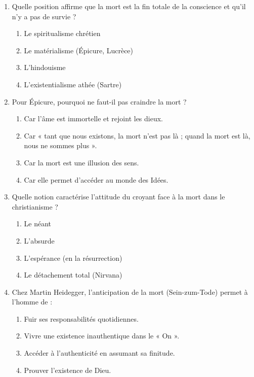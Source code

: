 \documentclass[11pt]{article}
\begin{document}
\begin{exercice}
\begin{enumerate}
    \item Quelle position affirme que la mort est la fin totale de la conscience et qu'il n'y a pas de survie ?
    \begin{enumerate}
        \item Le spiritualisme chrétien
        \item Le matérialisme (Épicure, Lucrèce)
        \item L'hindouisme
        \item L'existentialisme athée (Sartre)
    \end{enumerate}
    \item Pour Épicure, pourquoi ne faut-il pas craindre la mort ?
    \begin{enumerate}
        \item Car l'âme est immortelle et rejoint les dieux.
        \item Car « tant que nous existons, la mort n'est pas là ; quand la mort est là, nous ne sommes plus ».
        \item Car la mort est une illusion des sens.
        \item Car elle permet d'accéder au monde des Idées.
    \end{enumerate}
    \item Quelle notion caractérise l'attitude du croyant face à la mort dans le christianisme ?
    \begin{enumerate}
        \item Le néant
        \item L'absurde
        \item L'espérance (en la résurrection)
        \item Le détachement total (Nirvana)
    \end{enumerate}
    \item Chez Martin Heidegger, l'anticipation de la mort (Sein-zum-Tode) permet à l'homme de :
    \begin{enumerate}
        \item Fuir ses responsabilités quotidiennes.
        \item Vivre une existence inauthentique dans le « On ».
        \item Accéder à l'authenticité en assumant sa finitude.
        \item Prouver l'existence de Dieu.
    \end{enumerate}
\end{enumerate}
\end{exercice}
\end{document}

